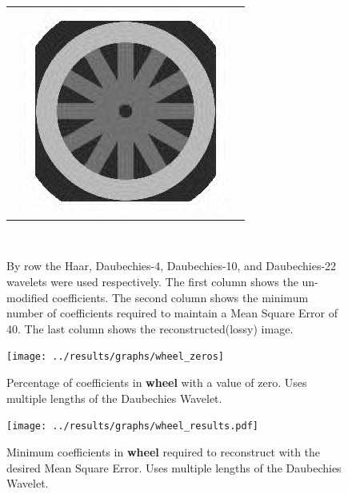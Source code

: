 \begin{figure}[hbt]
\begin{tabular}{ S @{} S @{} S }
		&	\includegraphics[height=0.25\textwidth]{../images/wheel_d22_final} \\
	\end{tabular} \\
	\caption{By row the Haar, Daubechies-4, Daubechies-10, and Daubechies-22 wavelets were used 
					 respectively. The first
					 column shows the un-modified coefficients.  The second column shows the minimum number
					 of coefficients required to maintain a Mean Square Error of 40.
					 The last column shows the reconstructed(lossy) image.}
\end{figure}


\begin{figure}[hbt]
	\centering
	\label{fig:wheel_zeros}
		\texttt{[image: ../results/graphs/wheel\_zeros]}
	\caption{Percentage of coefficients in {\bf wheel} with a value of zero. Uses multiple lengths of the Daubechies Wavelet. }
\end{figure}
\begin{figure}[hbt]
	\centering
	\label{fig:wheel_stats}
		\texttt{[image: ../results/graphs/wheel\_results.pdf]}
	\caption{Minimum coefficients in {\bf wheel} required to reconstruct with the desired Mean Square Error. Uses multiple lengths of the Daubechies Wavelet. }
\end{figure}


